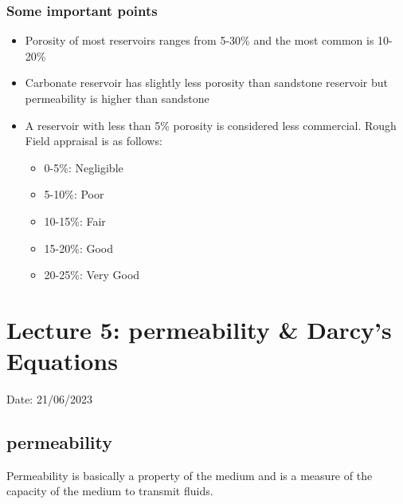 \documentclass{article}
\begin{document}
  \subsubsection*{Some important points}
  \begin{itemize}
    \item Porosity of most reservoirs ranges from 5-30\% and the most 
    common is 10-20\%
    \item Carbonate reservoir has slightly less porosity than sandstone 
    reservoir but permeability is higher than sandstone
    \item A reservoir with less than 5\% porosity is considered less 
    commercial. Rough Field appraisal is as follows:
    \begin{itemize}
        \item 0-5\%: Negligible
        \item 5-10\%: Poor
        \item 10-15\%: Fair
        \item 15-20\%: Good
        \item 20-25\%: Very Good
    \end{itemize}
  \end{itemize}

    \section{Lecture 5: permeability \& Darcy's Equations}
    \hfill Date: 21/06/2023 

    \subsection*{permeability}
    Permeability is basically a property of the medium and is a measure of the capacity of the medium to transmit fluids.
\end{document}
